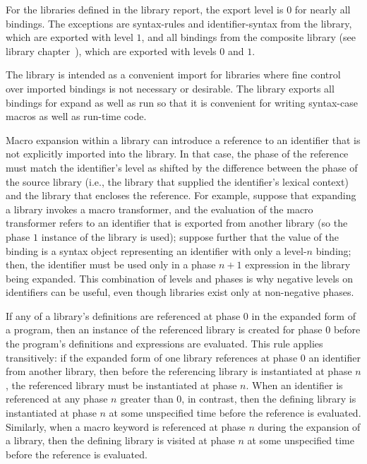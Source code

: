 For the libraries defined in the library report, the export level is
$0$ for nearly all bindings. The exceptions are {\cf syntax-rules}
and {\cf identifier-syntax} 
from the  library, which are exported
with level $1$, and all bindings from the composite \thersixlibrary{}
library (see library chapter~), which are
exported with levels $0$ and $1$.

\begin{rationale} 
The \thersixlibrary{} library is intended as a convenient import for libraries where fine
control over imported bindings is not necessary or desirable. The \thersixlibrary{} library
exports all bindings for {\cf expand} as well as {\cf run} so that it is convenient
for writing {\cf syntax-case} macros as well as run-time code.
\end{rationale}

Macro expansion within a library can introduce a reference to an
identifier that is not explicitly imported into the library. In that
case, the phase of the reference must match the identifier's level as
shifted by the difference between the phase of the source library
(i.e., the library that supplied the identifier's lexical context) and
the library that encloses the reference. For example, suppose that
expanding a library invokes a macro transformer, and the evaluation of
the macro transformer refers to an identifier that is exported from
another library (so the phase $1$ instance of the library is used);
suppose further that the value of the binding is a syntax object
representing an identifier with only a level-$n$ binding; then, the
identifier must be used only in a phase $n+1$ expression in the
library being expanded. This combination of levels and phases is why
negative levels on identifiers can be useful, even though libraries
exist only at non-negative phases.

If any of a library's definitions are referenced at phase $0$ in the
expanded form of a program, then an instance of the referenced library
is created for phase $0$ before the program's definitions and
expressions are evaluated. This rule applies transitively: if the
expanded form of one library references at phase $0$ an identifier
from another library, then before the referencing library is
instantiated at phase $n$, the referenced library must be instantiated
at phase $n$. When an identifier is referenced at any phase $n$
greater than $0$, in contrast, then the defining library is
instantiated at phase $n$ at some unspecified time before the
reference is evaluated. Similarly, when a macro keyword is referenced at
phase $n$ during the expansion of a library, then the
defining library is visited at phase $n$ at some unspecified time
before the reference is evaluated.

